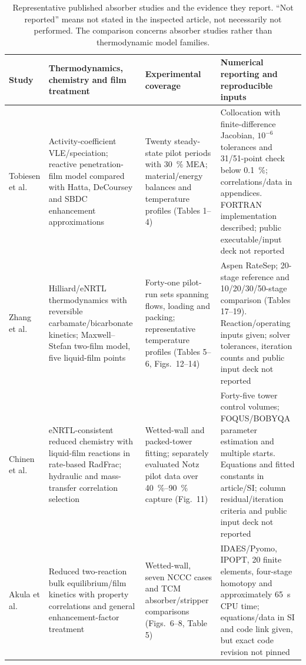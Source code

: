\begin{table}[pos=htbp]
\centering
\small
\caption{Representative published absorber studies and the evidence they report. ``Not reported'' means not stated in the inspected article, not necessarily not performed. The comparison concerns absorber studies rather than thermodynamic model families.}
\label{tab:absorber-literature-comparison}
\begin{tabularx}{\textwidth}{@{}>{\raggedright\arraybackslash}p{}*{3}{>{\raggedright\arraybackslash}X}@{}}
\toprule
Study & Thermodynamics, chemistry and film treatment & Experimental coverage & Numerical reporting and reproducible inputs \\
\midrule
Tobiesen et al.\ \cite{Tobiesen2007} & Activity-coefficient VLE/speciation; reactive penetration-film model compared with Hatta, DeCoursey and SBDC enhancement approximations & Twenty steady-state pilot periods with \qty{30}{\percent} MEA; material/energy balances and temperature profiles (Tables 1--4) & Collocation with finite-difference Jacobian, \(10^{-6}\) tolerances and 31/51-point check below \qty{0.1}{\percent}; correlations/data in appendices. FORTRAN implementation described; public executable/input deck not reported \\
\addlinespace
Zhang et al.\ \cite{Zhang2009} & Hilliard/eNRTL thermodynamics with reversible carbamate/bicarbonate kinetics; Maxwell--Stefan two-film model, five liquid-film points & Forty-one pilot-run sets spanning flows, loading and packing; representative temperature profiles (Tables 5--6, Figs.\ 12--14) & Aspen RateSep; 20-stage reference and 10/20/30/50-stage comparison (Tables 17--19). Reaction/operating inputs given; solver tolerances, iteration counts and public input deck not reported \\
\addlinespace
Chinen et al.\ \cite{Chinen2018} & eNRTL-consistent reduced chemistry with liquid-film reactions in rate-based RadFrac; hydraulic and mass-transfer correlation selection & Wetted-wall and packed-tower fitting; separately evaluated Notz pilot data over \qtyrange{40}{90}{\percent} capture (Fig.\ 11) & Forty-five tower control volumes; FOQUS/BOBYQA parameter estimation and multiple starts. Equations and fitted constants in article/SI; column residual/iteration criteria and public input deck not reported \\
\addlinespace
Akula et al.\ \cite{Akula2021} & Reduced two-reaction bulk equilibrium/film kinetics with property correlations and general enhancement-factor treatment & Wetted-wall, seven NCCC cases and TCM absorber/stripper comparisons (Figs.\ 6--8, Table 5) & IDAES/Pyomo, IPOPT, 20 finite elements, four-stage homotopy and approximately \qty{65}{s} CPU time; equations/data in SI and code link given, but exact code revision not pinned \\

\end{tabularx}
\end{table}
